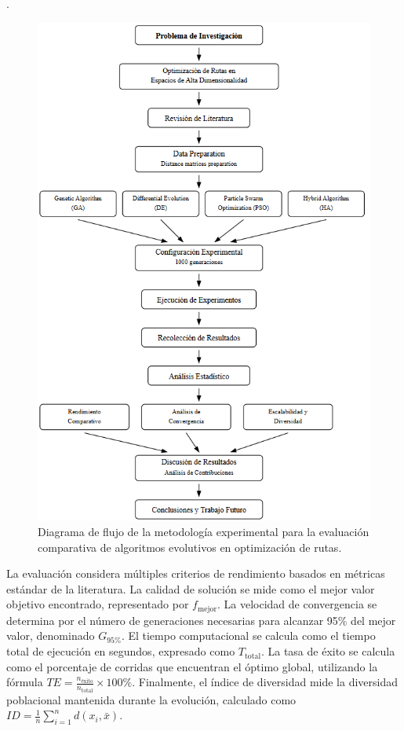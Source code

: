 \documentclass[conference]{IEEEtran}
\begin{document}
\vspace{6cm}
.
\begin{figure}[H]
\centering
\includegraphics[width=0.95\columnwidth]{diagrama2.png}
\caption{Diagrama de flujo de la metodología experimental para la evaluación comparativa de algoritmos evolutivos en optimización de rutas.}
\label{fig:methodology_flowchart}
\end{figure}



La evaluación considera múltiples criterios de rendimiento basados en métricas estándar de la literatura. La calidad de solución se mide como el mejor valor objetivo encontrado, representado por $f_{\text{mejor}}$. La velocidad de convergencia se determina por el número de generaciones necesarias para alcanzar 95\% del mejor valor, denominado $G_{95\%}$. El tiempo computacional se calcula como el tiempo total de ejecución en segundos, expresado como $T_{\text{total}}$. La tasa de éxito se calcula como el porcentaje de corridas que encuentran el óptimo global, utilizando la fórmula $TE = \frac{n_{\text{éxito}}}{n_{\text{total}}} \times 100\%$. Finalmente, el índice de diversidad mide la diversidad poblacional mantenida durante la evolución, calculado como $ID = \frac{1}{n}\sum_{i=1}^{n}d(x_i, \bar{x})$.
\end{document}

